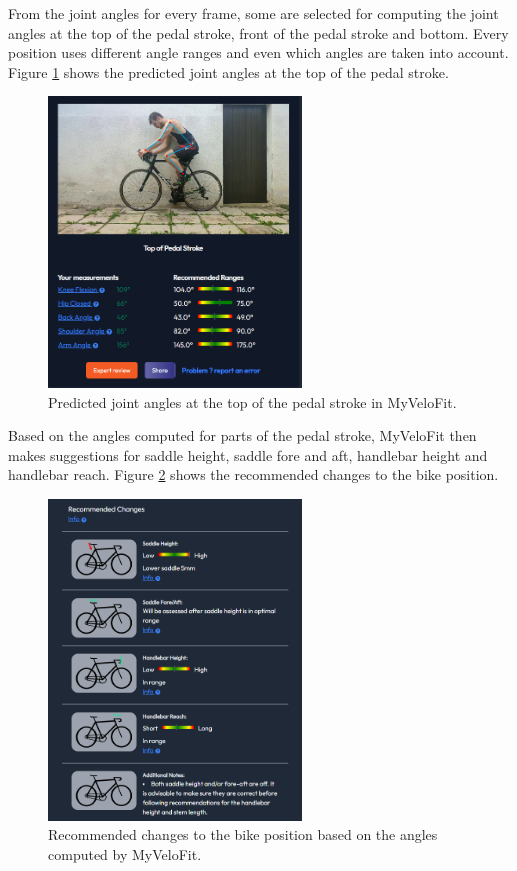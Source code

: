 From the joint angles for every frame, some are selected for computing the joint angles at the top of the pedal stroke, front of the pedal stroke and bottom. Every position uses different angle ranges and even which angles are taken into account. Figure \ref{fig:myvelofit_top} shows the predicted joint angles at the top of the pedal stroke.

\begin{figure}[htbp]
    \centering
    \includegraphics[width=0.6\textwidth]{obrazky-figures/myvelofit_top.png}
    \caption{Predicted joint angles at the top of the pedal stroke in MyVeloFit.}
    \label{fig:myvelofit_top}
\end{figure}

Based on the angles computed for parts of the pedal stroke, MyVeloFit then makes suggestions for saddle height, saddle fore and aft, handlebar height and handlebar reach. Figure \ref{fig:myvelofit_suggestions} shows the recommended changes to the bike position.

\begin{figure}[htbp]
    \centering
    \includegraphics[width=0.6\textwidth]{obrazky-figures/myvelofit_suggestions.png}
    \caption{Recommended changes to the bike position based on the angles computed by MyVeloFit.}
    \label{fig:myvelofit_suggestions}
\end{figure}

